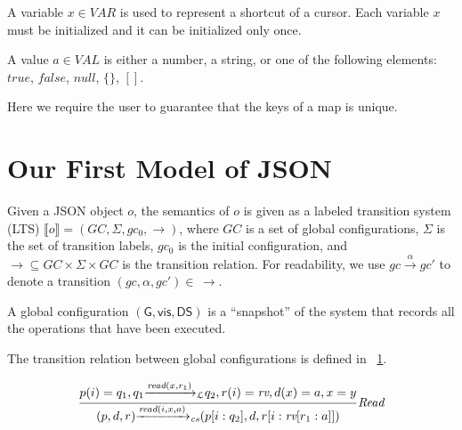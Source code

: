 A variable $x \in VAR$ is used to represent a shortcut of a cursor. Each variable $x$ must be initialized and it can be initialized only once.

A value $a \in VAL$ is either a number, a string, or one of the following elements: $\mathit{true}$, $\mathit{false}$, $\mathit{null}$, $\{ \}$, $[ ]$. 

Here we require the user to guarantee that the keys of a map is unique. 




\section{Our First Model of JSON}
\label{sec:our first model of json}

Given a JSON object $o$, the semantics of $o$ is given as a labeled transition system (LTS) $\llbracket o \rrbracket = (GC,\Sigma,gc_0,\rightarrow)$, where $GC$ is a set of global configurations, $\Sigma$ is the set of transition labels, $gc_0$ is the initial configuration, and $\rightarrow \subseteq GC \times \Sigma \times GC$ is the transition relation. For readability, we use $gc \xrightarrow{\alpha} gc'$ to denote a transition $(gc,\alpha,gc')\in\,\rightarrow$.











A global configuration $(\mathsf{G}, \mathsf{vis}, \mathsf{DS})$ is a ``snapshot'' of the system that records all the operations that have been executed. 



The transition relation between global configurations is defined in \figureautorefname~\ref{fig:crdt-opsem}.

\begin{figure}
\[
\begin{array}{l c}
\bigfrac{p(i)=q_1, q_1
{\xrightarrow{\textit{read}(x,r_1)}}_{\mathcal{L}}
q_2,r(i)=\textit{rv},d(x)=a, 
x = y } {(p,d,r)
{\xrightarrow{\textit{read}(i,x,a)}}_{\textit{cs}}
(p[i:q_2],d,r[ i:\textit{rv}[r_1:a] ])} {\textit{Read}}
\end{array}
\]
\label{fig:crdt-opsem}
\vspace{-5mm}
\end{figure} 

